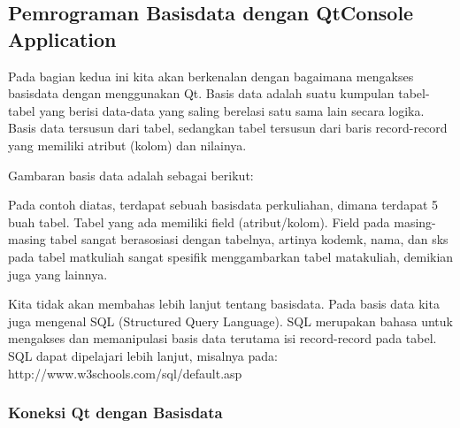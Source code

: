 \subsection{Pemrograman Basisdata dengan QtConsole
Application}\label{pemrograman-basisdata-dengan-qtconsole-application}

Pada bagian kedua ini kita akan berkenalan dengan bagaimana mengakses
basisdata dengan menggunakan Qt. Basis data adalah suatu kumpulan
tabel-tabel yang berisi data-data yang saling berelasi satu sama lain
secara logika. Basis data tersusun dari tabel, sedangkan tabel tersusun
dari baris record-record yang memiliki atribut (kolom) dan nilainya.

Gambaran basis data adalah sebagai berikut:

Pada contoh diatas, terdapat sebuah basisdata perkuliahan, dimana
terdapat 5 buah tabel. Tabel yang ada memiliki field (atribut/kolom).
Field pada masing-masing tabel sangat berasosiasi dengan tabelnya,
artinya kodemk, nama, dan sks pada tabel matkuliah sangat spesifik
menggambarkan tabel matakuliah, demikian juga yang lainnya.

Kita tidak akan membahas lebih lanjut tentang basisdata. Pada basis data
kita juga mengenal SQL (Structured Query Language). SQL merupakan bahasa
untuk mengakses dan memanipulasi basis data terutama isi record-record
pada tabel. SQL dapat dipelajari lebih lanjut, misalnya pada:
http://www.w3schools.com/sql/default.asp

\subsubsection{Koneksi Qt dengan
Basisdata}\label{koneksi-qt-dengan-basisdata}

